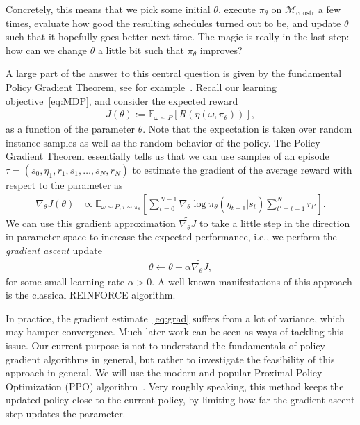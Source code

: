 \documentclass{report}
\theoremstyle{definition}
\theoremstyle{plain}
\begin{document}
Concretely, this means that we pick some initial $\theta$, execute $\pi_\theta$
on $\mathcal{M}_\mathrm{constr}$ a few times, evaluate how good the resulting
schedules turned out to be, and update $\theta$ such that it hopefully goes
better next time.
%
The magic is really in the last step: how can we change $\theta$ a little bit
such that $\pi_\theta$ improves?

A large part of the answer to this central question is given by the
fundamental Policy Gradient Theorem, see for
example~\cite{suttonReinforcementLearningIntroduction2018}.
%
Recall our learning objective~\eqref{eq:MDP}, and consider the expected reward
\begin{align}
  J(\theta) := \mathbb{E}_{\omega \sim P}[R(\eta(\omega, \pi_\theta))] ,
\end{align}
as a function of the parameter $\theta$. Note that the expectation is taken
over random instance samples as well as the random behavior of the policy.
%
The Policy Gradient Theorem essentially tells us that we can use samples of an
episode $\tau = (s_0, \eta_1, r_1, s_1, \dots, s_N, r_N)$ to estimate the gradient of
the average reward with respect to the parameter as
%
\begin{align}\label{eq:grad}
  \nabla_\theta J(\theta) &\propto \mathbb{E}_{\omega \sim P, \tau \sim \pi_\theta} \left[ \sum_{t=0}^{N-1} \nabla_\theta \log \pi_\theta(\eta_{t+1} | s_{t}) \sum_{t'=t+1}^{N} r_{t'}  \right]  .
\end{align}
%
We can use this gradient approximation $\widetilde{\nabla_\theta J}$ to take a
little step in the direction in parameter space to increase the expected
performance, i.e., we perform the \emph{gradient ascent} update
\begin{align*}
  \theta \leftarrow \theta + \alpha \widetilde{\nabla_\theta J} ,
\end{align*}
for some small learning rate $\alpha > 0$.
%
A well-known manifestations of this approach is the classical REINFORCE
algorithm.

In practice, the gradient estimate~\eqref{eq:grad} suffers from a lot of
variance, which may hamper convergence.
%
%
Much later work can be seen as ways of tackling this issue.
%
Our current purpose is not to understand the fundamentals of policy-gradient
algorithms in general, but rather to investigate the feasibility of this
approach in general. We will use the modern and popular Proximal Policy
Optimization (PPO) algorithm~\cite{schulmanProximalPolicyOptimization2017}. Very roughly speaking, this method keeps
the updated policy close to the current policy, by limiting how far the gradient
ascent step updates the parameter.
\end{document}
